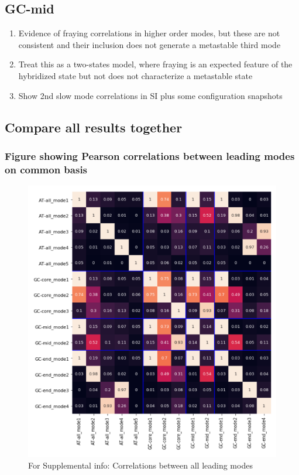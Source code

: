 \documentclass[journal=jpcbfk,manuscript=article]{achemso}
\begin{document}
\subsection{\label{sec:Results}GC-mid}
\begin{enumerate}
	\item Evidence of fraying correlations in higher order modes, but these are not consistent and their inclusion does not generate a metastable third mode
	\item Treat this as a two-states model, where fraying is an expected feature of the hybridized state but not does not characterize a metastable state
	\item Show 2nd slow mode correlations in SI plus some configuration snapshots
	
	
\end{enumerate}  



\subsection{\label{sec:Results}Compare all results together}
\subsubsection{\label{sec:Results}Figure showing Pearson correlations between leading modes on common basis}

\begin{figure}[ht!]
	\begin{center}
        \includegraphics[width=\textwidth]{Figs/skeleton/all_modes_correlations.PNG}
        \caption{For Supplemental info: Correlations between all leading modes}
        \label{fig:all_modes}
	\end{center}
\end{figure}
\end{document}

